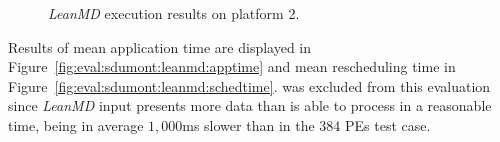 
\begin{figure}[!ht]
 \centering
 \caption{\textit{LeanMD} execution results on platform 2.}
 \label{fig:eval:sdumont:leanmd}
\end{figure}



Results of mean application time are displayed in Figure~\ref{fig:eval:sdumont:leanmd:apptime} and mean rescheduling time in Figure~\ref{fig:eval:sdumont:leanmd:schedtime}.
 was excluded from this evaluation since \textit{LeanMD} input presents more data than  is able to process in a reasonable time, being in average $1,000$ms slower than \greedylb in the $384$ PEs test case. %

